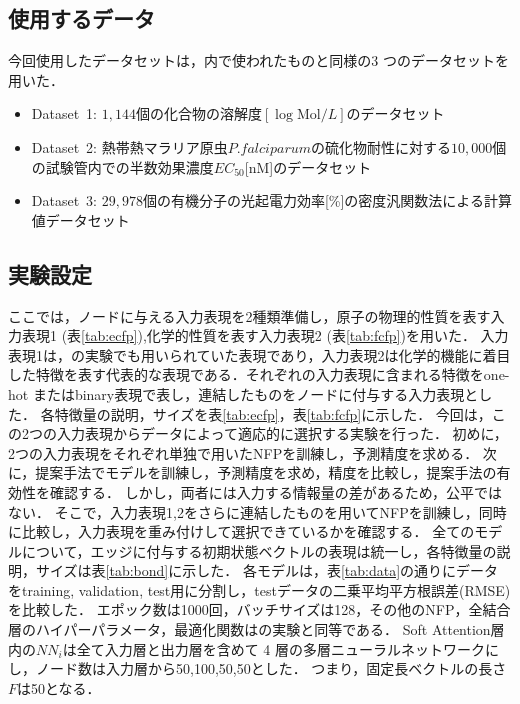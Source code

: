 \documentclass[twocolumn]{jarticle}
\begin{document}
\subsection{使用するデータ}
今回使用したデータセットは，\cite{NNFP}内で使われたものと同様の3 つのデータセットを用いた．
\begin{itemize}
\setlength{\itemsep}{0pt}
\item Dataset~1: $1,144$個の化合物の溶解度$[\log{\mathrm{Mol}/L}]$のデータセット\cite{delaney}
\item Dataset~2: 熱帯熱マラリア原虫\(P.falciparum\)の硫化物耐性に対する$10,000$個の試験管内での半数効果濃度$EC_{50}$[nM]のデータセット\cite{malaria}
\item Dataset~3: $29,978$個の有機分子の光起電力効率[\%]の密度汎関数法による計算値データセット\cite{cep}
\end{itemize}

\vspace{-7pt}
\subsection{実験設定}
ここでは，ノードに与える入力表現を2種類準備し，原子の物理的性質を表す入力表現1 (表\ref{tab:ecfp}),化学的性質を表す入力表現2 (表\ref{tab:fcfp})を用いた．
入力表現1は，\cite{NNFP}の実験でも用いられていた表現であり，入力表現2は化学的機能に着目した特徴を表す代表的な表現である．それぞれの入力表現に含まれる特徴をone-hot またはbinary表現で表し，連結したものをノードに付与する入力表現とした．
各特徴量の説明，サイズを表\ref{tab:ecfp}，表\ref{tab:fcfp}に示した．
今回は，この2つの入力表現からデータによって適応的に選択する実験を行った．
初めに，2つの入力表現をそれぞれ単独で用いたNFPを訓練し，予測精度を求める．
次に，提案手法でモデルを訓練し，予測精度を求め，精度を比較し，提案手法の有効性を確認する．
しかし，両者には入力する情報量の差があるため，公平ではない．
そこで，入力表現1,2をさらに連結したものを用いてNFPを訓練し，同時に比較し，入力表現を重み付けして選択できているかを確認する．
全てのモデルについて，エッジに付与する初期状態ベクトルの表現は統一し，各特徴量の説明，サイズは表\ref{tab:bond}に示した．
各モデルは，表\ref{tab:data}の通りにデータをtraining, validation, test用に分割し，testデータの二乗平均平方根誤差(RMSE)を比較した．
エポック数は1000回，バッチサイズは128，その他のNFP，全結合層のハイパーパラメータ，最適化関数は\cite{NNFP}の実験と同等である．
Soft Attention層内の$NN_i$は全て入力層と出力層を含めて 4 層の多層ニューラルネットワークにし，ノード数は入力層から50,100,50,50とした．
つまり，固定長ベクトルの長さ$F$は50となる．
\end{document}
